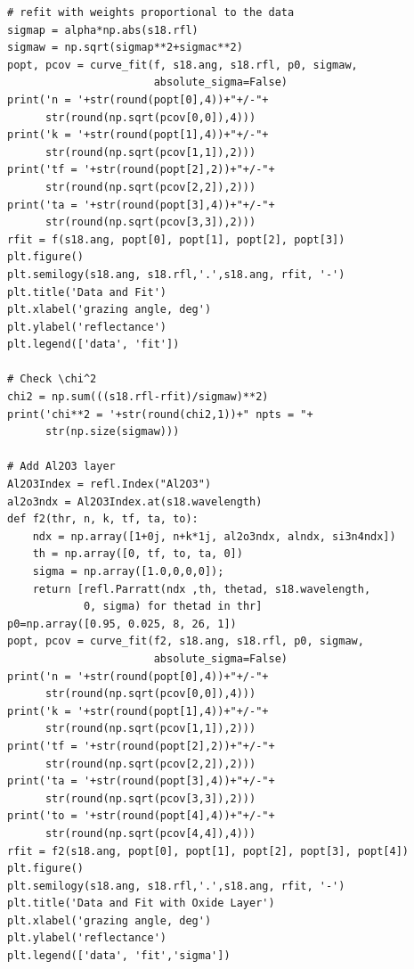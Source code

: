 \documentclass[english]{scrartcl}
\begin{document}
\begin{lstlisting}
# refit with weights proportional to the data
sigmap = alpha*np.abs(s18.rfl)
sigmaw = np.sqrt(sigmap**2+sigmac**2)
popt, pcov = curve_fit(f, s18.ang, s18.rfl, p0, sigmaw,
                       absolute_sigma=False)
print('n = '+str(round(popt[0],4))+"+/-"+
      str(round(np.sqrt(pcov[0,0]),4)))
print('k = '+str(round(popt[1],4))+"+/-"+
      str(round(np.sqrt(pcov[1,1]),2)))
print('tf = '+str(round(popt[2],2))+"+/-"+
      str(round(np.sqrt(pcov[2,2]),2)))
print('ta = '+str(round(popt[3],4))+"+/-"+
      str(round(np.sqrt(pcov[3,3]),2)))
rfit = f(s18.ang, popt[0], popt[1], popt[2], popt[3])
plt.figure()
plt.semilogy(s18.ang, s18.rfl,'.',s18.ang, rfit, '-')
plt.title('Data and Fit')
plt.xlabel('grazing angle, deg')
plt.ylabel('reflectance')
plt.legend(['data', 'fit'])

# Check \chi^2
chi2 = np.sum(((s18.rfl-rfit)/sigmaw)**2)
print('chi**2 = '+str(round(chi2,1))+" npts = "+
      str(np.size(sigmaw)))

# Add Al2O3 layer
Al2O3Index = refl.Index("Al2O3")
al2o3ndx = Al2O3Index.at(s18.wavelength)
def f2(thr, n, k, tf, ta, to):
    ndx = np.array([1+0j, n+k*1j, al2o3ndx, alndx, si3n4ndx])
    th = np.array([0, tf, to, ta, 0])
    sigma = np.array([1.0,0,0,0]);
    return [refl.Parratt(ndx ,th, thetad, s18.wavelength,
            0, sigma) for thetad in thr]
p0=np.array([0.95, 0.025, 8, 26, 1])
popt, pcov = curve_fit(f2, s18.ang, s18.rfl, p0, sigmaw,
                       absolute_sigma=False)
print('n = '+str(round(popt[0],4))+"+/-"+
      str(round(np.sqrt(pcov[0,0]),4)))
print('k = '+str(round(popt[1],4))+"+/-"+
      str(round(np.sqrt(pcov[1,1]),2)))
print('tf = '+str(round(popt[2],2))+"+/-"+
      str(round(np.sqrt(pcov[2,2]),2)))
print('ta = '+str(round(popt[3],4))+"+/-"+
      str(round(np.sqrt(pcov[3,3]),2)))
print('to = '+str(round(popt[4],4))+"+/-"+
      str(round(np.sqrt(pcov[4,4]),4)))
rfit = f2(s18.ang, popt[0], popt[1], popt[2], popt[3], popt[4])
plt.figure()
plt.semilogy(s18.ang, s18.rfl,'.',s18.ang, rfit, '-')
plt.title('Data and Fit with Oxide Layer')
plt.xlabel('grazing angle, deg')
plt.ylabel('reflectance')
plt.legend(['data', 'fit','sigma'])


\end{lstlisting}
\end{document}
